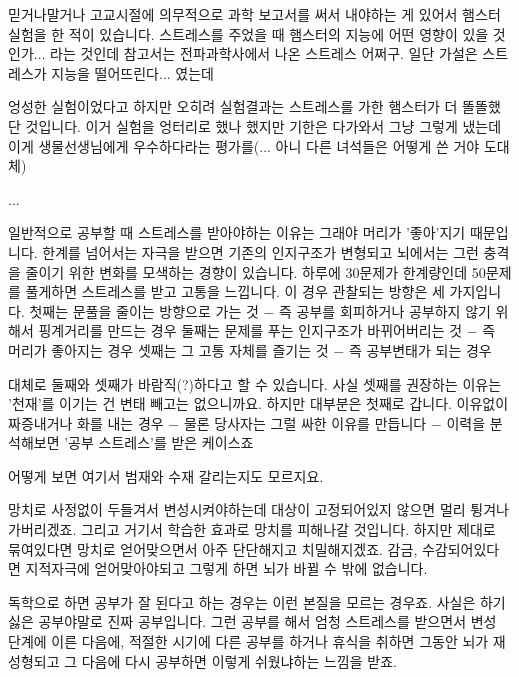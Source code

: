 \vspace{5mm}

믿거나말거나
고교시절에 의무적으로 과학 보고서를 써서 내야하는 게 있어서 햄스터 실험을 한 적이 있습니다.
스트레스를 주었을 때 햄스터의 지능에 어떤 영향이 있을 것인가... 라는 것인데 참고서는 전파과학사에서 나온 스트레스 어쩌구.
일단 가설은 스트레스가 지능을 떨어뜨린다... 였는데
\vspace{5mm}

엉성한 실험이었다고 하지만 오히려 실험결과는 스트레스를 가한 햄스터가 더 똘똘했단 것입니다.
이거 실험을 엉터리로 했나 했지만 기한은 다가와서 그냥 그렇게 냈는데
이게 생물선생님에게 우수하다라는 평가를(... 아니 다른 녀석들은 어떻게 쓴 거야 도대체)
\vspace{5mm}

...
\vspace{5mm}

일반적으로 공부할 때 스트레스를 받아야하는 이유는 그래야 머리가 '좋아'지기 때문입니다.
한계를 넘어서는 자극을 받으면 기존의 인지구조가 변형되고 뇌에서는 그런 충격을 줄이기 위한 변화를 모색하는 경향이 있습니다.
하루에 30문제가 한계량인데 50문제를 풀게하면 스트레스를 받고 고통을 느낍니다.
이 경우 관찰되는 방향은 세 가지입니다.
첫째는 문풀을 줄이는 방향으로 가는 것 $-$ 즉 공부를 회피하거나 공부하지 않기 위해서 핑계거리를 만드는 경우
둘째는 문제를 푸는 인지구조가 바뀌어버리는 것 $-$ 즉 머리가 좋아지는 경우
셋째는 그 고통 자체를 즐기는 것 $-$ 즉 공부변태가 되는 경우
\vspace{5mm}

대체로 둘째와 셋째가 바람직(?)하다고 할 수 있습니다. 사실 셋째를 권장하는 이유는 '천재'를 이기는 건 변태 빼고는 없으니까요.
하지만 대부분은 첫째로 갑니다.
이유없이 짜증내거나 화를 내는 경우 $-$ 물론 당사자는 그럴 싸한 이유를 만듭니다 $-$ 이력을 분석해보면 '공부 스트레스'를 받은 케이스죠
\vspace{5mm}

어떻게 보면 여기서 범재와 수재 갈리는지도 모르지요.
\vspace{5mm}

망치로 사정없이 두들겨서 변성시켜야하는데 대상이 고정되어있지 않으면 멀리 튕겨나가버리겠죠.
그리고 거기서 학습한 효과로 망치를 피해나갈 것입니다.
하지만 제대로 묶여있다면 망치로 얻어맞으면서 아주 단단해지고 치밀해지겠죠.
감금, 수감되어있다면 지적자극에 얻어맞아야되고 그렇게 하면 뇌가 바뀔 수 밖에 없습니다.
\vspace{5mm}

독학으로 하면 공부가 잘 된다고 하는 경우는 이런 본질을 모르는 경우죠.
사실은 하기싫은 공부야말로 진짜 공부입니다. 그런 공부를 해서 엄청 스트레스를 받으면서 변성 단계에 이른 다음에,
적절한 시기에 다른 공부를 하거나 휴식을 취하면 그동안 뇌가 재성형되고 그 다음에 다시 공부하면 이렇게 쉬웠냐하는 느낌을 받죠.
\vspace{5mm}

